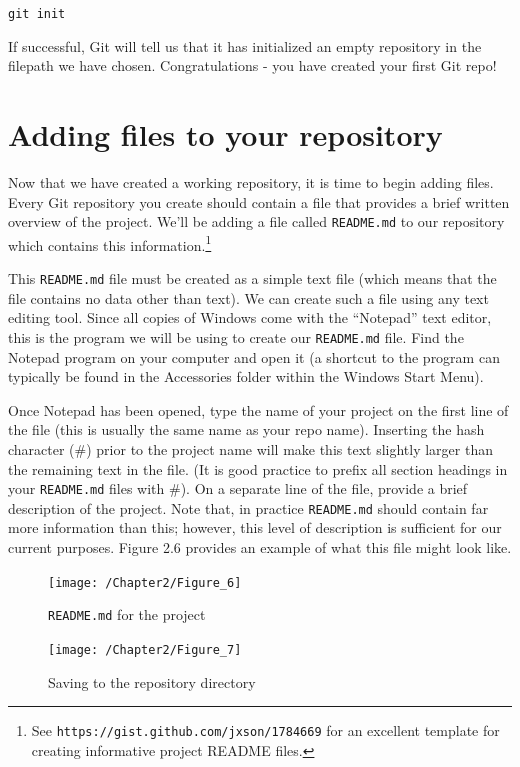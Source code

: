 \documentclass{book}
\begin{document}
\texttt{git init}

If successful, Git will tell us that it has initialized an empty repository in the filepath we have chosen. Congratulations - you have created your first Git repo!

\section{Adding files to your repository}
Now that we have created a working repository, it is time to begin adding files. Every Git repository you create should contain a file that provides a brief written overview of the project. We'll be adding a file called \texttt{README.md} to our repository which contains this information.\footnote{See \texttt{https://gist.github.com/jxson/1784669} for an excellent template for creating informative project README files.}

This \texttt{README.md} file must be created as a simple text file (which means that the file contains no data other than text). We can create such a file using any text editing tool. Since all copies of Windows come with the ``Notepad'' text editor, this is the program we will be using to create our \texttt{README.md} file. Find the Notepad program on your computer and open it (a shortcut to the program can typically be found in the Accessories folder within the Windows Start Menu).

Once Notepad has been opened, type the name of your project on the first line of the file (this is usually the same name as your repo name). Inserting the hash character (\#) prior to the project name will make this text slightly larger than the remaining text in the file. (It is good practice to prefix all section headings in your \texttt{README.md} files with \#). On a separate line of the file, provide a brief description of the project. Note that, in practice \texttt{README.md} should contain far more information than this; however, this level of description is sufficient for our current purposes. Figure 2.6 provides an example of what this file might look like.

\begin{figure}[h]
	\caption{\texttt{README.md} for the project}
	\centering\texttt{[image: /Chapter2/Figure\_6]}
\end{figure}

\begin{figure}[h]
	\caption{Saving to the repository directory}
	\centering\texttt{[image: /Chapter2/Figure\_7]}
\end{figure}
\end{document}
